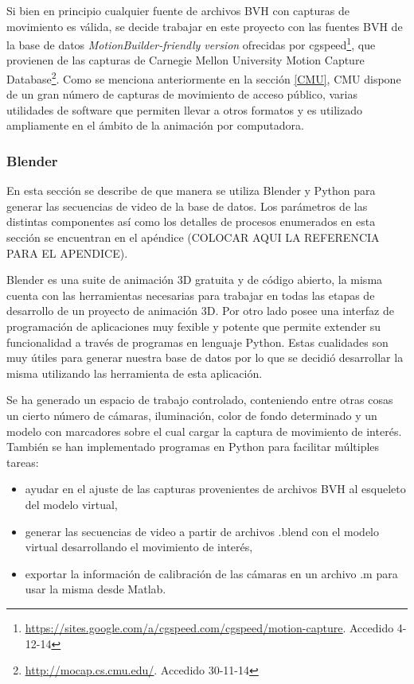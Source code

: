 Si bien en principio cualquier fuente de archivos BVH con capturas de movimiento es válida, se decide trabajar en este proyecto con las fuentes BVH de la base de datos \textit{MotionBuilder-friendly version} ofrecidas por cgspeed\footnote{\textcolor{blue}{\underline{\url{https://sites.google.com/a/cgspeed.com/cgspeed/motion-capture}}}. Accedido 4-12-14},
 que provienen de las capturas de Carnegie Mellon University Motion Capture Database\footnote{\textcolor{blue}{\underline{\url{http://mocap.cs.cmu.edu/}}}. Accedido 30-11-14}. 
 Como se menciona anteriormente en la sección \ref{CMU}, CMU dispone de un gran número de capturas de movimiento de acceso público, varias utilidades de software que permiten llevar a otros formatos y es utilizado ampliamente en el ámbito de la animación por computadora.




\subsubsection{Blender} %
En esta sección se describe de que manera se utiliza Blender y Python para generar las secuencias de video de la base de datos. Los parámetros de las distintas componentes así como los detalles de procesos enumerados en esta sección se encuentran en el apéndice (COLOCAR AQUI LA REFERENCIA PARA EL APENDICE).



Blender es una suite de animación 3D gratuita y de código abierto, la misma cuenta con las herramientas necesarias para trabajar en todas las etapas de desarrollo de un proyecto de animación 3D. Por otro lado posee una interfaz de programación de aplicaciones muy fexible y potente que permite extender su funcionalidad a través de programas en lenguaje Python. Estas cualidades son muy útiles para generar nuestra base de datos por lo que se decidió desarrollar la misma utilizando las herramienta de esta aplicación.

Se ha generado un espacio de trabajo controlado, conteniendo entre otras cosas un cierto número de cámaras, iluminación, color de fondo determinado y un modelo con marcadores sobre el cual cargar la captura de movimiento de interés. También se han implementado programas en Python para facilitar múltiples tareas:

\begin{itemize}
\item  ayudar en  el ajuste de las capturas provenientes de archivos BVH al esqueleto del modelo virtual,
\item	generar las secuencias de video a partir de archivos .blend  con el modelo virtual desarrollando el movimiento de interés,
\item	exportar la información de calibración de las cámaras en un archivo .m para usar la misma desde Matlab.
\end{itemize}


